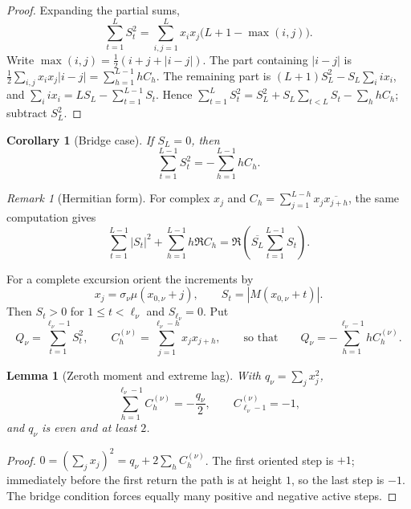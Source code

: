 \documentclass[11pt]{amsart}
\numberwithin{equation}{section}
\theoremstyle{plain}
\newtheorem{lemma}[theorem]{Lemma}
\newtheorem{corollary}[theorem]{Corollary}
\theoremstyle{definition}
\theoremstyle{remark}
\newtheorem{remark}[theorem]{Remark}
\begin{document}
\begin{proof}
Expanding the partial sums,
\[
\sum_{t=1}^{L}S_t^2
=\sum_{i,j=1}^{L}x_ix_j\bigl(L+1-\max(i,j)\bigr).
\]
Write $\max(i,j)=\tfrac12(i+j+|i-j|)$. The part containing $|i-j|$ is
$\tfrac12\sum_{i,j}x_ix_j|i-j|=\sum_{h=1}^{L-1}hC_h$. The remaining part is
$(L+1)S_L^2-S_L\sum_i ix_i$, and $\sum_i ix_i=LS_L-\sum_{t=1}^{L-1}S_t$.
Hence
$\sum_{t=1}^{L}S_t^2=S_L^2+S_L\sum_{t<L}S_t-\sum_hhC_h$; subtract $S_L^2$.
\end{proof}

\begin{corollary}[Bridge case]
\label{cor:bridge}
If $S_L=0$, then
\begin{equation}
\label{eq:bridge-triangular}
\sum_{t=1}^{L-1}S_t^2=-\sum_{h=1}^{L-1}hC_h.
\end{equation}
\end{corollary}

\begin{remark}[Hermitian form]
\label{rem:hermitian}
For complex $x_j$ and $C_h=\sum_{j=1}^{L-h}x_j\overline{x_{j+h}}$, the same
computation gives
\[
\sum_{t=1}^{L-1}|S_t|^2+\sum_{h=1}^{L-1}h\Re C_h
=\Re\!\left(\overline{S_L}\sum_{t=1}^{L-1}S_t\right).
\]
\end{remark}

For a complete excursion orient the increments by
\begin{equation}
\label{eq:orientation}
x_j=\sigma_\nu\mu(x_{0,\nu}+j),\qquad
S_t=|M(x_{0,\nu}+t)|.
\end{equation}
Then $S_t>0$ for $1\le t<\ell_\nu$ and $S_{\ell_\nu}=0$. Put
\begin{equation}
\label{eq:Q_def}
Q_\nu=\sum_{t=1}^{\ell_\nu-1}S_t^2,\qquad
C_h^{(\nu)}=\sum_{j=1}^{\ell_\nu-h}x_jx_{j+h},
\qquad\text{so that}\qquad
Q_\nu=-\sum_{h=1}^{\ell_\nu-1}hC_h^{(\nu)}.
\end{equation}

\begin{lemma}[Zeroth moment and extreme lag]
\label{lem:zeroth-corr}
\label{lem:extreme-lag}
With $q_\nu=\sum_jx_j^2$,
\begin{equation}
\label{eq:zeroth-corr}
\sum_{h=1}^{\ell_\nu-1}C_h^{(\nu)}=-\frac{q_\nu}{2},\qquad
C_{\ell_\nu-1}^{(\nu)}=-1,
\end{equation}
and $q_\nu$ is even and at least $2$.
\end{lemma}

\begin{proof}
$0=(\sum_jx_j)^2=q_\nu+2\sum_hC_h^{(\nu)}$. The first oriented step is $+1$;
immediately before the first return the path is at height $1$, so the last
step is $-1$. The bridge condition forces equally many positive and negative
active steps.
\end{proof}
\end{document}
